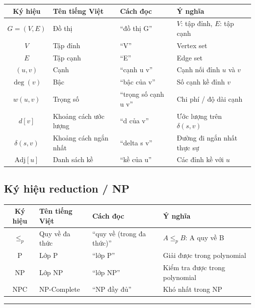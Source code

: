 \documentclass[10pt]{article}
\begin{document}
\begin{center}
\begin{tabular}{|c|l|l|l|}
\hline
\textbf{Ký hiệu} & \textbf{Tên tiếng Việt} & \textbf{Cách đọc} & \textbf{Ý nghĩa} \\
\hline
$G = (V, E)$ & Đồ thị & ``đồ thị G'' & $V$: tập đỉnh, $E$: tập cạnh \\
\hline
$V$ & Tập đỉnh & ``V'' & Vertex set \\
\hline
$E$ & Tập cạnh & ``E'' & Edge set \\
\hline
$(u, v)$ & Cạnh & ``cạnh u v'' & Cạnh nối đỉnh $u$ và $v$ \\
\hline
$\deg(v)$ & Bậc & ``bậc của v'' & Số cạnh kề đỉnh $v$ \\
\hline
$w(u,v)$ & Trọng số & ``trọng số cạnh u v'' & Chi phí / độ dài cạnh \\
\hline
$d[v]$ & Khoảng cách ước lượng & ``d của v'' & Ước lượng trên $\delta(s,v)$ \\
\hline
$\delta(s,v)$ & Khoảng cách ngắn nhất & ``delta s v'' & Đường đi ngắn nhất thực sự \\
\hline
$\text{Adj}[u]$ & Danh sách kề & ``kề của u'' & Các đỉnh kề với $u$ \\
\hline
\end{tabular}
\end{center}

\subsection{Ký hiệu reduction / NP}

\begin{center}
\begin{tabular}{|c|l|l|l|}
\hline
\textbf{Ký hiệu} & \textbf{Tên tiếng Việt} & \textbf{Cách đọc} & \textbf{Ý nghĩa} \\
\hline
$\leq_p$ & Quy về đa thức & ``quy về (trong đa thức)'' & $A \leq_p B$: A quy về B \\
\hline
P & Lớp P & ``lớp P'' & Giải được trong polynomial \\
\hline
NP & Lớp NP & ``lớp NP'' & Kiểm tra được trong polynomial \\
\hline
NPC & NP-Complete & ``NP đầy đủ'' & Khó nhất trong NP \\
\hline
\end{tabular}
\label{tab:np-reduction}
\end{center}

\begin{center}\rule{0.5\linewidth}{0.5pt}\end{center}
\end{document}
